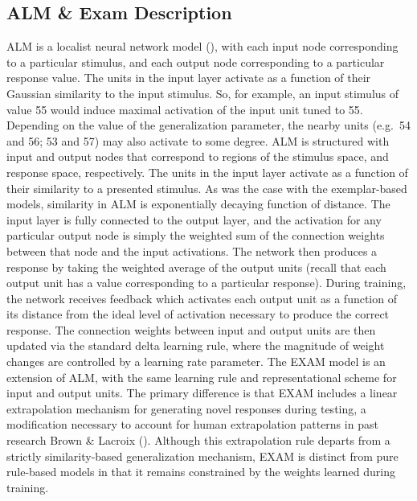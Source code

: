 \documentclass[
  letterpaper,
  DIV=11,
  numbers=noendperiod,
  oneside]{scrartcl}
\begin{document}
\subsection{ALM \& Exam Description}\label{alm-exam-description}

ALM is a localist neural network model
(),
with each input node corresponding to a particular stimulus, and each
output node corresponding to a particular response value. The units in
the input layer activate as a function of their Gaussian similarity to
the input stimulus. So, for example, an input stimulus of value 55 would
induce maximal activation of the input unit tuned to 55. Depending on
the value of the generalization parameter, the nearby units (e.g.~54 and
56; 53 and 57) may also activate to some degree. ALM is structured with
input and output nodes that correspond to regions of the stimulus space,
and response space, respectively. The units in the input layer activate
as a function of their similarity to a presented stimulus. As was the
case with the exemplar-based models, similarity in ALM is exponentially
decaying function of distance. The input layer is fully connected to the
output layer, and the activation for any particular output node is
simply the weighted sum of the connection weights between that node and
the input activations. The network then produces a response by taking
the weighted average of the output units (recall that each output unit
has a value corresponding to a particular response). During training,
the network receives feedback which activates each output unit as a
function of its distance from the ideal level of activation necessary to
produce the correct response. The connection weights between input and
output units are then updated via the standard delta learning rule,
where the magnitude of weight changes are controlled by a learning rate
parameter. The EXAM model is an extension of ALM, with the same learning
rule and representational scheme for input and output units. The primary
difference is that EXAM includes a linear extrapolation mechanism for
generating novel responses during testing, a modification necessary to
account for human extrapolation patterns in past research Brown \&
Lacroix ().
Although this extrapolation rule departs from a strictly
similarity-based generalization mechanism, EXAM is distinct from pure
rule-based models in that it remains constrained by the weights learned
during training.
\end{document}
